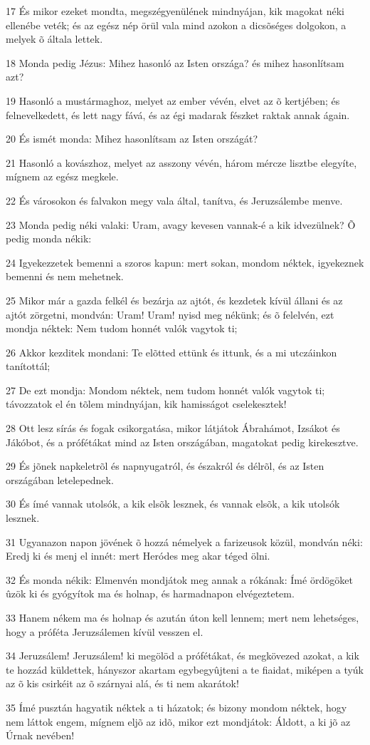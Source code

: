 \par 17 És mikor ezeket mondta, megszégyenülének mindnyájan, kik magokat néki ellenébe veték; és az egész nép örül vala mind azokon a dicsõséges dolgokon, a melyek õ általa lettek.
\par 18 Monda pedig Jézus: Mihez hasonló az Isten országa? és mihez hasonlítsam azt?
\par 19 Hasonló a mustármaghoz, melyet az ember vévén, elvet az õ kertjében; és felnevelkedett, és lett nagy fává, és az égi madarak fészket raktak annak ágain.
\par 20 És ismét monda: Mihez hasonlítsam az Isten országát?
\par 21 Hasonló a kovászhoz, melyet az asszony vévén, három mércze lisztbe elegyíte, mígnem az egész megkele.
\par 22 És városokon és falvakon megy vala által, tanítva, és Jeruzsálembe menve.
\par 23 Monda pedig néki valaki: Uram, avagy kevesen vannak-é a kik idvezülnek? Õ pedig monda nékik:
\par 24 Igyekezzetek bemenni a szoros kapun: mert sokan,  mondom néktek, igyekeznek bemenni és nem mehetnek.
\par 25 Mikor már a gazda felkél és bezárja az ajtót, és kezdetek kívül állani és az ajtót zörgetni, mondván: Uram! Uram! nyisd meg nékünk; és õ felelvén, ezt mondja néktek: Nem  tudom honnét valók vagytok ti;
\par 26 Akkor kezditek mondani: Te elõtted ettünk és ittunk, és a mi utczáinkon tanítottál;
\par 27 De ezt mondja: Mondom néktek, nem tudom honnét valók vagytok ti; távozzatok el én tõlem mindnyájan, kik hamisságot cselekesztek!
\par 28 Ott lesz sírás és fogak csikorgatása, mikor látjátok Ábrahámot, Izsákot és Jákóbot, és a prófétákat mind az Isten országában, magatokat pedig kirekesztve.
\par 29 És jõnek napkeletrõl és napnyugatról, és északról és délrõl, és az Isten országában letelepednek.
\par 30 És ímé vannak utolsók, a kik elsõk lesznek, és vannak elsõk, a kik utolsók lesznek.
\par 31 Ugyanazon napon jövének õ hozzá némelyek a farizeusok közül, mondván néki: Eredj ki és menj el innét: mert Heródes meg akar téged ölni.
\par 32 És monda nékik: Elmenvén mondjátok meg annak a rókának: Ímé ördögöket ûzök ki és gyógyítok ma és holnap, és harmadnapon elvégeztetem.
\par 33 Hanem nékem ma és holnap és azután úton kell lennem; mert nem lehetséges, hogy a próféta Jeruzsálemen kívül vesszen el.
\par 34 Jeruzsálem! Jeruzsálem! ki megölöd a prófétákat, és megkövezed azokat, a kik te hozzád küldettek, hányszor akartam egybegyûjteni a te fiaidat, miképen a tyúk az õ kis csirkéit az õ szárnyai alá, és  ti nem akarátok!
\par 35 Ímé pusztán hagyatik néktek a ti házatok; és bizony mondom néktek, hogy nem láttok engem, mígnem eljõ az idõ, mikor ezt mondjátok:  Áldott, a ki jõ az Úrnak nevében!


